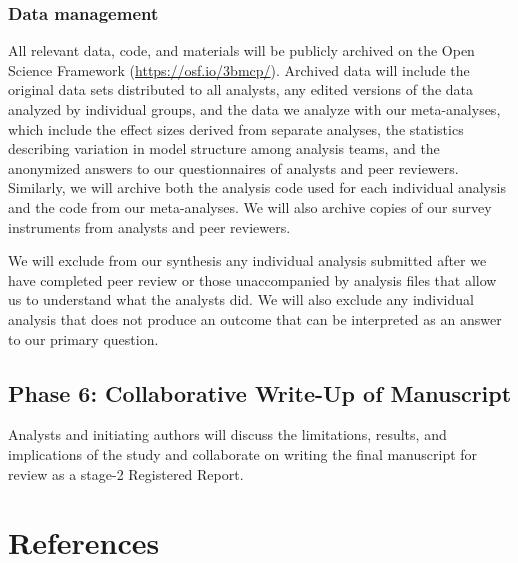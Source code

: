 \documentclass[
  12pt,
]{article}
\begin{document}
\hypertarget{ana-archive}{%
\subsubsection{Data management}\label{ana-archive}}

All relevant data, code, and materials will be publicly archived on the Open Science Framework (\url{https://osf.io/3bmcp/}).
Archived data will include the original data sets distributed to all analysts, any edited versions of the data analyzed by individual groups, and the data we analyze with our meta-analyses, which include the effect sizes derived from separate analyses, the statistics describing variation in model structure among analysis teams, and the anonymized answers to our questionnaires of analysts and peer reviewers.
Similarly, we will archive both the analysis code used for each individual analysis and the code from our meta-analyses.
We will also archive copies of our survey instruments from analysts and peer reviewers.

We will exclude from our synthesis any individual analysis submitted after we have completed peer review or those unaccompanied by analysis files that allow us to understand what the analysts did.
We will also exclude any individual analysis that does not produce an outcome that can be interpreted as an answer to our primary question.

\hypertarget{phase-6-collaborative-write-up-of-manuscript}{%
\subsection{Phase 6: Collaborative Write-Up of Manuscript}\label{phase-6-collaborative-write-up-of-manuscript}}

Analysts and initiating authors will discuss the limitations, results, and implications of the study and collaborate on writing the final manuscript for review as a stage-2 Registered Report.

\newpage

\hypertarget{references}{%
\section{References}\label{references}}

\begingroup
\setlength{\parindent}{-0.5in}
\setlength{\leftskip}{0.5in}
\end{document}
